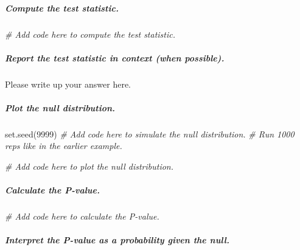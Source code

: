 \documentclass[
]{book}
\newenvironment{Shaded}{\begin{snugshade}}{\end{snugshade}}
\newcommand{\CommentTok}[1]{\textcolor[rgb]{0.56,0.35,0.01}{\textit{#1}}}
\newcommand{\DecValTok}[1]{\textcolor[rgb]{0.00,0.00,0.81}{#1}}
\newcommand{\FunctionTok}[1]{\textcolor[rgb]{0.00,0.00,0.00}{#1}}
\newcommand{\NormalTok}[1]{#1}
\begin{document}
\hypertarget{compute-the-test-statistic.}{%
\subparagraph*{Compute the test statistic.}\label{compute-the-test-statistic.}}

\begin{Shaded}
\begin{Highlighting}[]
\CommentTok{\# Add code here to compute the test statistic.}
\end{Highlighting}
\end{Shaded}

\hypertarget{report-the-test-statistic-in-context-when-possible.}{%
\subparagraph*{Report the test statistic in context (when possible).}\label{report-the-test-statistic-in-context-when-possible.}}

Please write up your answer here.

\hypertarget{plot-the-null-distribution.}{%
\subparagraph*{Plot the null distribution.}\label{plot-the-null-distribution.}}

\begin{Shaded}
\begin{Highlighting}[]
\FunctionTok{set.seed}\NormalTok{(}\DecValTok{9999}\NormalTok{)}
\CommentTok{\# Add code here to simulate the null distribution.}
\CommentTok{\# Run 1000 reps like in the earlier example.}
\end{Highlighting}
\end{Shaded}

\begin{Shaded}
\begin{Highlighting}[]
\CommentTok{\# Add code here to plot the null distribution.}
\end{Highlighting}
\end{Shaded}

\hypertarget{calculate-the-p-value.}{%
\subparagraph*{Calculate the P-value.}\label{calculate-the-p-value.}}

\begin{Shaded}
\begin{Highlighting}[]
\CommentTok{\# Add code here to calculate the P{-}value.}
\end{Highlighting}
\end{Shaded}

\hypertarget{interpret-the-p-value-as-a-probability-given-the-null.}{%
\subparagraph*{Interpret the P-value as a probability given the null.}\label{interpret-the-p-value-as-a-probability-given-the-null.}}
\end{document}
